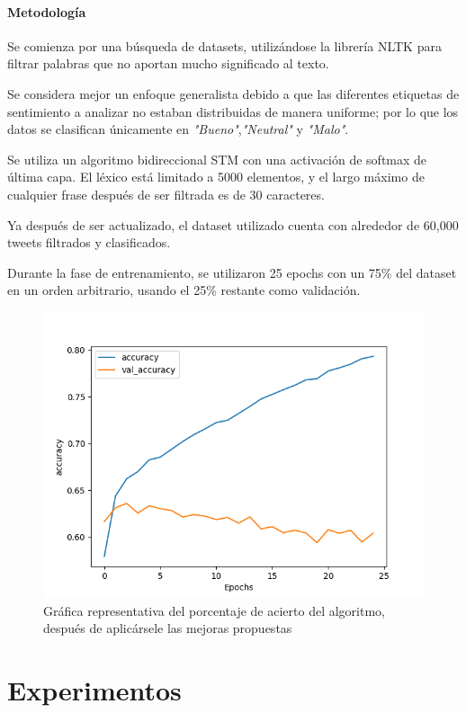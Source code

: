 \documentclass[a4]{sciposter}
\begin{document}
\begin{multicols}{2}
\paragraph{Metodología}
Se comienza por una búsqueda de datasets, utilizándose la librería NLTK \citep{nltk} para filtrar palabras que no aportan mucho significado al texto.

Se considera mejor un enfoque generalista debido a que las diferentes etiquetas de sentimiento a analizar no estaban distribuidas de manera uniforme; por lo que los datos se clasifican únicamente en \textit{"Bueno"},\textit{"Neutral"} y \textit{"Malo"}.

Se utiliza un algoritmo bidireccional STM con una activación de softmax de última capa. El léxico está limitado a 5000 elementos, y el largo máximo de cualquier frase después de ser filtrada es de 30 caracteres.

Ya después de ser actualizado, el dataset utilizado cuenta con alrededor de 60,000 tweets filtrados y clasificados.

Durante la fase de entrenamiento, se utilizaron 25 epochs con un 75\% del dataset en un orden arbitrario, usando el 25\% restante como validación.

\begin{figure}
	\centering
	\captionsetup{type=figure}
	\setcounter{figure}{1}
	\includegraphics[scale=1.5]{img/Accuracy 2021-07.png}
	\caption{Gráfica representativa del porcentaje de acierto del algoritmo, después de aplicársele las mejoras propuestas}	
\end{figure}

\section{Experimentos}


\end{multicols}
\end{document}
